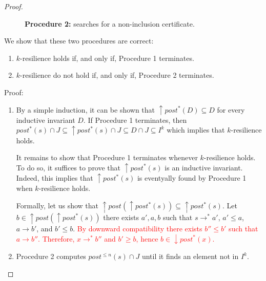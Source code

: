 \begin{proof}
\begin{figure}
	\caption{\textbf{Procedure 2:} searches for a non-inclusion certificate.}\label{procedure2}
\end{figure}

\newpage


We show that these two procedures are correct:


\begin{enumerate}

\item $k$-resilience holds if, and only if, Procedure 1 terminates.

\item $k$-resilience do not hold if, and only if, Procedure 2 terminates.

\end{enumerate}

Proof:

\begin{enumerate}

\item By a simple induction, it can be shown that $\uparrow post^*(D) \subseteq D$ for every inductive invariant $D$. 
If Procedure 1 terminates, then
$post^*(s) \cap J \subseteq \uparrow post^*(s) \cap J \subseteq D  \cap J \subseteq I^k$
which implies that $k$-resilience holds.

It remains to show that Procedure 1 terminates whenever $k$-resilience holds. To do so, it suffices to prove that $\uparrow post^*(s)$ is an inductive invariant. Indeed, this implies that
$\uparrow post^*(s)$ is eventyally found by Procedure 1 when $k$-resilience holds. 

Formally, let us show that $\uparrow post(\uparrow post^*(s)) \subseteq \uparrow post^*(s)$.
Let $b \in \uparrow post(\uparrow post^*(s))$ 
there exists $a', a, b$ such that
$s \rightarrow^* a'$,
$a' \leq a$,
$a \rightarrow b'$,
and
$b' \leq b$.
\textcolor{red}{By downward compatibility 
there exists $b'' \leq b'$ such that $a \rightarrow b'' $. Therefore, $x \rightarrow^* b''$ and $b' \geq b$, hence $b \in \downarrow post^*(x)$.}
\item Procedure 2 computes
 $post^{\leq n}(s) \cap J$
 until it finds an element not in $ I^k$.


\end{enumerate}
\end{proof}
